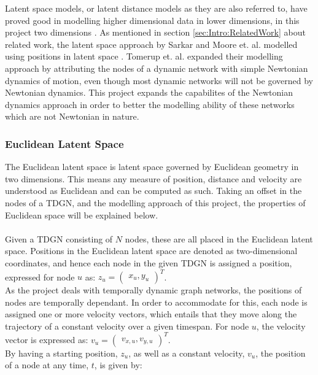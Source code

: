 Latent space models, or latent distance models as they are also referred to, have proved good in modelling higher dimensional data in lower dimensions, in this project two dimensions \cite{Gourieroux2021ScalableNetworks}.
As mentioned in section \ref{sec:Intro:RelatedWork} about related work, the latent space approach by Sarkar and Moore et. al. modelled using positions in latent space \cite{Sarkar2005DynamicModels}.
Tomerup et. al. \cite{Tommerup2021LearningNetworks} expanded their modelling approach by attributing the nodes of a dynamic network with simple Newtonian dynamics of motion, even though most dynamic networks will not be governed by Newtonian dynamics.
This project expands the capabilites of the Newtonian dynamics approach in order to better the modelling ability of these networks which are not Newtonian in nature.


\subsubsection{Euclidean Latent Space}
\label{sec:Method:LSM:EuclideanLatentSpace}
The Euclidean latent space is latent space governed by Euclidean geometry in two dimensions.
This means any measure of position, distance and velocity are understood as Euclidean and can be computed as such. 
Taking an offset in the nodes of a TDGN, and the modelling approach of this project, the properties of Euclidean space will be explained below.
\\\\
Given a TDGN consisting of $N$ nodes, these are all placed in the Euclidean latent space. 
Positions in the Euclidean latent space are denoted as two-dimensional coordinates, and hence each node in the given TDGN is assigned a position, expressed for node $u$ as:
$z_u = \begin{pmatrix}
x_u, y_u
\end{pmatrix}^T$.
\\
As the project deals with temporally dynamic graph networks, the positions of nodes are temporally dependant. 
In order to accommodate for this, each node is assigned one or more velocity vectors, which entails that they move along the trajectory of a constant velocity over a given timespan.
For node $u$, the velocity vector is expressed as:
$v_u = \begin{pmatrix}
v_{x,u}, v_{y,u}
\end{pmatrix}^T$.
\\
By having a starting position, $z_u$, as well as a constant velocity, $v_u$, the position of a node at any time, $t$, is given by: 


